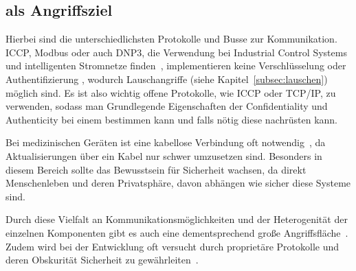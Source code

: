 \subsection{ als Angriffsziel}\label{subsec:angriffsziel}
Hierbei sind die unterschiedlichsten Protokolle und Busse zur Kommunikation.
ICCP, Modbus oder auch DNP3, die Verwendung bei Industrial Control Systems und intelligenten Stromnetze finden~\cite{HLL+17}, implementieren keine Verschlüsselung oder Authentifizierung \cite{HUM 124,HUM 38,HUM 69}, wodurch Lauschangriffe (siehe Kapitel~\ref{subsec:lauschen}) möglich sind.
Es ist also wichtig offene Protokolle, wie ICCP oder TCP/IP, zu verwenden, sodass man Grundlegende Eigenschaften der Confidentiality und Authenticity bei einem \cps bestimmen kann und falls nötig diese nachrüsten kann.

Bei medizinischen Geräten ist eine kabellose Verbindung oft notwendig~\cite{HLL+17}, da Aktualisierungen über ein Kabel nur schwer umzusetzen sind.
Besonders in diesem Bereich sollte das Bewusstsein für Sicherheit wachsen, da direkt Menschenleben und deren Privatsphäre, davon abhängen wie sicher diese Systeme sind.

Durch diese Vielfalt an Kommunikationsmöglichkeiten und der Heterogenität der einzelnen Komponenten gibt es auch eine dementsprechend große Angriffsfläche~\cite{HLL+17}.
Zudem wird bei der Entwicklung oft versucht durch proprietäre Protokolle und deren Obskurität Sicherheit zu gewährleiten~\cite{HLL+17,SJT2008}.




